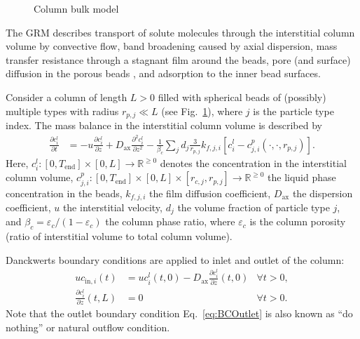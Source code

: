 \begin{figure}[!htb]
{
	}
	\caption{Column bulk model\label{fig:ModelGRMColumn}}
\end{figure}

The GRM describes transport of solute molecules through the interstitial column volume by convective flow, band broadening caused by axial dispersion, mass transfer resistance through a stagnant film around the beads, pore (and surface) diffusion in the porous beads \cite{Ma1996, Schneider1968a, Miyabe2007}, and adsorption to the inner bead surfaces.

Consider a column of length $L>0$ filled with spherical beads of (possibly) multiple types with radius $r_{p,j} \ll L$ (see Fig.~\ref{fig:ModelGRMColumn}), where $j$ is the particle type index. 
The mass balance in the interstitial column volume is described by
\begin{align}
	\frac{\partial c^l_i}{\partial t} &= -u \frac{\partial c^l_i}{\partial z} + D_{\text{ax}} \frac{\partial^2 c^l_i}{\partial z^2} - \frac{1}{\beta_c} \sum_j d_j \frac{3}{r_{p,j}} k_{f,j,i} \left[ c^l_i - c^p_{j,i}(\cdot, \cdot, r_{p,j}) \right]. \label{eq:ModelColumn}
\end{align}
Here, $c^l_i\colon \left[0, T_{\text{end}}\right] \times [0, L] \rightarrow \mathds{R}^{\geq 0}$ denotes the concentration in the interstitial column volume, $c^p_{j,i}\colon \left[0, T_{\text{end}}\right] \times [0, L] \times [r_{c,j}, r_{p,j}] \rightarrow \mathds{R}^{\geq 0}$ the liquid phase concentration in the beads, $k_{f,j,i}$ the film diffusion coefficient, $D_{\text{ax}}$ the dispersion coefficient, $u$ the interstitial velocity, $d_j$ the volume fraction of particle type $j$, and $\beta_c = \varepsilon_c / (1 - \varepsilon_c)$ the column phase ratio, where $\varepsilon_c$ is the column porosity (ratio of interstitial volume to total column volume).

Danckwerts boundary conditions \cite{Danckwerts1953} are applied to inlet and outlet of the column:
\begin{align}
	u c_{\text{in},i}(t) &= u c^l_i(t,0) - D_{\text{ax}} \frac{\partial c^l_i}{\partial z}(t, 0) \label{eq:BCInlet} & \forall t > 0,\\
	\frac{\partial c^l_i}{\partial z}(t, L) &= 0 & \forall t > 0. \label{eq:BCOutlet}
\end{align}
Note that the outlet boundary condition Eq.~\eqref{eq:BCOutlet} is also known as ``do nothing'' or natural outflow condition.


